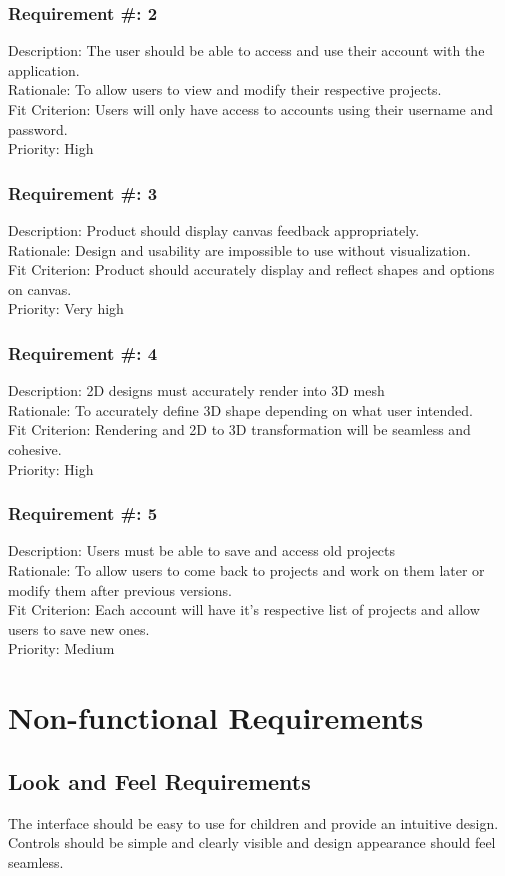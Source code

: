 \documentclass{report}
\begin{document}
\subsection{Requirement \#: 2}
Description: The user should be able to access and use their account with the application. 
\\Rationale:  To allow users to view and modify their respective projects.
\\Fit Criterion: Users will only have access to accounts using their username and password.
\\Priority: High
\subsection{Requirement \#: 3}
Description: Product should display canvas feedback appropriately.
\\Rationale:  Design and usability are impossible to use without visualization.
\\Fit Criterion:  Product should accurately display and reflect shapes and options on canvas.
\\Priority: Very high
\subsection{Requirement \#: 4}
Description: 2D designs must accurately render into 3D mesh 
\\Rationale: To accurately define 3D shape depending on what user intended. 
\\Fit Criterion: Rendering and 2D to 3D transformation will be seamless and cohesive.
\\Priority: High
\subsection{Requirement \#: 5}
Description: Users must be able to save and access old projects 
\\Rationale: To allow users to come back to projects and work on them later or modify them after previous versions.
\\Fit Criterion: Each account will have it's respective list of projects and allow users to save new ones.
\\Priority: Medium

\chapter{Non-functional Requirements}
\section{Look and Feel Requirements}
The interface should be easy to use for children and provide an intuitive design.  Controls should be simple and clearly visible and design appearance should feel seamless. 
\end{document}
